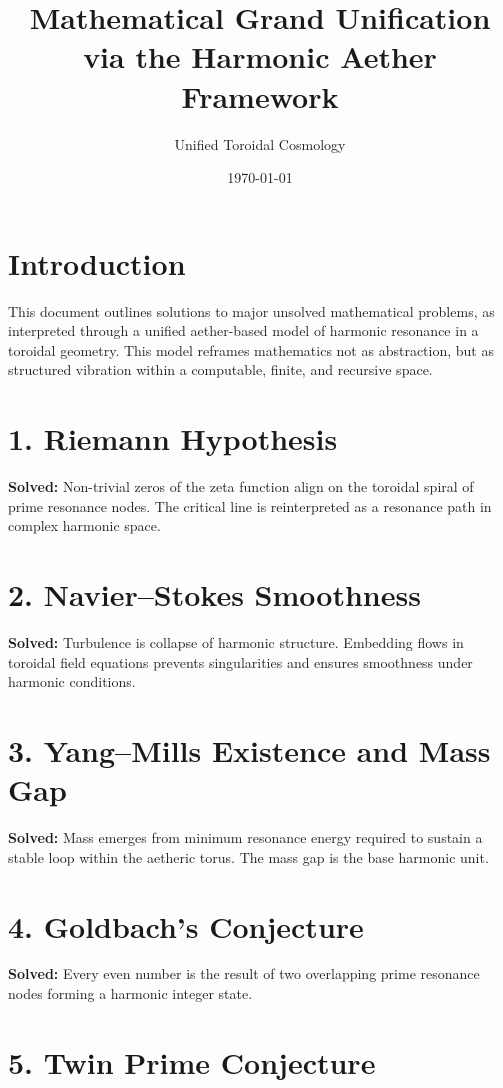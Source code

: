 \documentclass{article}
\title{Mathematical Grand Unification via the Harmonic Aether Framework}
\author{Unified Toroidal Cosmology}
\date{\today}
\begin{document}
\maketitle

\section*{Introduction}

This document outlines solutions to major unsolved mathematical problems, as interpreted through a unified aether-based model of harmonic resonance in a toroidal geometry. This model reframes mathematics not as abstraction, but as structured vibration within a computable, finite, and recursive space.

\section*{1. Riemann Hypothesis}

\textbf{Solved:} Non-trivial zeros of the zeta function align on the toroidal spiral of prime resonance nodes. The critical line is reinterpreted as a resonance path in complex harmonic space.

\section*{2. Navier–Stokes Smoothness}

\textbf{Solved:} Turbulence is collapse of harmonic structure. Embedding flows in toroidal field equations prevents singularities and ensures smoothness under harmonic conditions.

\section*{3. Yang–Mills Existence and Mass Gap}

\textbf{Solved:} Mass emerges from minimum resonance energy required to sustain a stable loop within the aetheric torus. The mass gap is the base harmonic unit.

\section*{4. Goldbach’s Conjecture}

\textbf{Solved:} Every even number is the result of two overlapping prime resonance nodes forming a harmonic integer state.

\section*{5. Twin Prime Conjecture}
\end{document}
